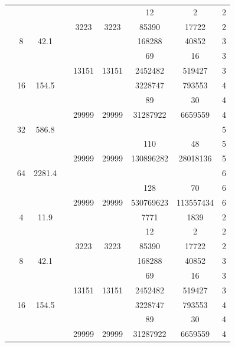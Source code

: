 \begin{table}[htbp]
\begin{tabular}{l S[table-format=3.0] S[table-format=4.1] l S[table-format=6.0] S[table-format=6.0] S[table-format=6.0] S[table-format=5.0] S[table-format=2.0]}
     &  &  &  & {\text{---}} & {\text{---}} & 12 & 2 & 2 \\
     &  &  &  & 3223 & 3223 & 85390 & 17722 & 2 \\
     & 8 & 42.1 &  & {\text{---}} & {\text{---}} & 168288 & 40852 & 3 \\
     &  &  &  & {\text{---}} & {\text{---}} & 69 & 16 & 3 \\
     &  &  &  & 13151 & 13151 & 2452482 & 519427 & 3 \\
     & 16 & 154.5 &  & {\text{---}} & {\text{---}} & 3228747 & 793553 & 4 \\
     &  &  &  & {\text{---}} & {\text{---}} & 89 & 30 & 4 \\
     &  &  &  & 29999 & 29999 & 31287922 & 6659559 & 4 \\
     & 32 & 586.8 &  & {\text{---}} & {\text{---}} & {\text{---}} & {\text{---}} & 5 \\
     &  &  &  & {\text{---}} & {\text{---}} & 110 & 48 & 5 \\
     &  &  &  & 29999 & 29999 & 130896282 & 28018136 & 5 \\
     & 64 & 2281.4 &  & {\text{---}} & {\text{---}} & {\text{---}} & {\text{---}} & 6 \\
     &  &  &  & {\text{---}} & {\text{---}} & 128 & 70 & 6 \\
     &  &  &  & 29999 & 29999 & 530769623 & 113557434 & 6 \\
    \midrule
     & 4 & 11.9 &  & {\text{---}} & {\text{---}} & 7771 & 1839 & 2 \\
     &  &  &  & {\text{---}} & {\text{---}} & 12 & 2 & 2 \\
     &  &  &  & 3223 & 3223 & 85390 & 17722 & 2 \\
     & 8 & 42.1 &  & {\text{---}} & {\text{---}} & 168288 & 40852 & 3 \\
     &  &  &  & {\text{---}} & {\text{---}} & 69 & 16 & 3 \\
     &  &  &  & 13151 & 13151 & 2452482 & 519427 & 3 \\
     & 16 & 154.5 &  & {\text{---}} & {\text{---}} & 3228747 & 793553 & 4 \\
     &  &  &  & {\text{---}} & {\text{---}} & 89 & 30 & 4 \\
     &  &  &  & 29999 & 29999 & 31287922 & 6659559 & 4 \\

\end{tabular}
\end{table}
